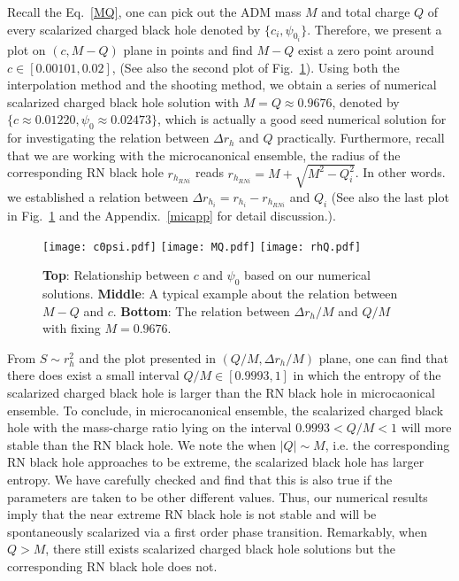 \documentclass[pr, twocolumn, preprintnumbers, showpacs,footnoteadded, superscriptaddress,nofootinbib,longbibliography]{revtex4-1}
\begin{document}
Recall the Eq.~\eqref{MQ}, one can pick out the ADM mass $M$ and total charge $Q$ of every scalarized charged black hole denoted by $\{c_{i}, \psi_{0_{i}}\}$. Therefore, we present a plot on $(c, M-Q)$ plane in points and find $M-Q$ exist a zero point around $c \in [0.00101, 0.02]$, (See also the second plot of Fig.~\ref{fig2}). Using both the interpolation method and the shooting method, we obtain a series of  numerical scalarized charged black hole solution with $M=Q \approx 0.9676$, denoted by $\{c \approx 0.01220, \psi_0 \approx 0.02473 \}$, which is actually a good seed numerical solution for for investigating the relation between $\Delta r_h$ and $Q$ practically.
Furthermore, recall that we are working with the microcanonical ensemble, the radius of the corresponding RN black hole  $r_{h_{RN i}} $ reads $r_{h_{RN i}}=M+\sqrt{M^2-Q_i^2} $. In other words.  we established a relation between $\Delta r_{h_i} = r_{h_i}-r_{h_{RN i}}$ and $Q_{i}$ (See also the last plot in Fig.~\ref{fig2} and the Appendix.~\ref{micapp} for detail discussion.).
%
\begin{figure}[htpb]
  \centering
  \texttt{[image: c0psi.pdf]}
  \texttt{[image: MQ.pdf]}
  \texttt{[image: rhQ.pdf]}
 \caption{\textbf{Top}: Relationship between $c$ and $\psi_0$ based on our numerical solutions. \textbf{Middle}: A typical example about the relation between $M-Q$ and $c$. \textbf{Bottom}: The relation between $\Delta r_h/M$ and $Q/M$ with fixing $M=0.9676$. }\label{fig2}
\end{figure}
%

From $S \sim r_h^2$ and the plot presented in $(Q/M, \Delta r_h/M)$ plane, one can find that there does exist a small interval $Q/M \in [0.9993,1]$ in which the entropy of the scalarized charged black hole is larger than the RN black hole in microcaonical ensemble. To conclude, in microcanonical ensemble, the scalarized charged black hole with the mass-charge ratio lying on the interval $0.9993<Q/M<1$ will more stable than the RN black hole. We note the when $|Q|\sim M$, i.e. the corresponding RN black hole approaches to be extreme, the scalarized black hole has larger entropy. We have carefully checked and find that this is also true if the parameters are taken to be other different values. Thus, our numerical results imply that the near extreme RN black hole is not stable and will be spontaneously scalarized via a first order phase transition. Remarkably, when $Q>M$, there still exists scalarized charged black hole solutions but the corresponding RN black hole does not.
\end{document}
